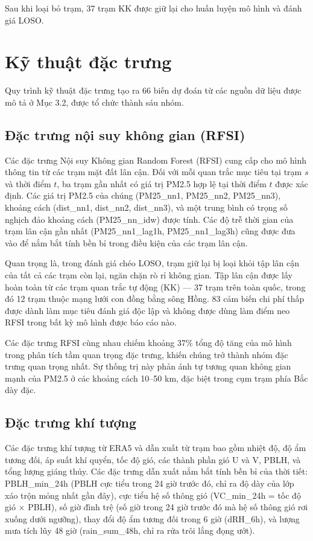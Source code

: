 Sau khi loại bỏ trạm, 37 trạm KK được giữ lại cho huấn luyện mô hình và đánh giá LOSO.


\section{Kỹ thuật đặc trưng}

Quy trình kỹ thuật đặc trưng tạo ra 66 biến dự đoán từ các nguồn dữ liệu được mô tả ở Mục 3.2, được tổ chức thành sáu nhóm.

\subsection{Đặc trưng nội suy không gian (RFSI)}

Các đặc trưng Nội suy Không gian Random Forest (RFSI) cung cấp cho mô hình thông tin từ các trạm mặt đất lân cận. Đối với mỗi quan trắc mục tiêu tại trạm $s$ và thời điểm $t$, ba trạm gần nhất có giá trị PM2.5 hợp lệ tại thời điểm $t$ được xác định. Các giá trị PM2.5 của chúng (PM25\_nn1, PM25\_nn2, PM25\_nn3), khoảng cách (dist\_nn1, dist\_nn2, dist\_nn3), và một trung bình có trọng số nghịch đảo khoảng cách (PM25\_nn\_idw) được tính. Các độ trễ thời gian của trạm lân cận gần nhất (PM25\_nn1\_lag1h, PM25\_nn1\_lag3h) cũng được đưa vào để nắm bắt tính bền bỉ trong điều kiện của các trạm lân cận.

Quan trọng là, trong đánh giá chéo LOSO, trạm giữ lại bị loại khỏi tập lân cận của tất cả các trạm còn lại, ngăn chặn rò rỉ không gian. Tập lân cận được lấy hoàn toàn từ các trạm quan trắc tự động (KK) --- 37 trạm trên toàn quốc, trong đó 12 trạm thuộc mạng lưới con đồng bằng sông Hồng. 83 cảm biến chi phí thấp được dành làm mục tiêu đánh giá độc lập và không được dùng làm điểm neo RFSI trong bất kỳ mô hình được báo cáo nào.

Các đặc trưng RFSI cùng nhau chiếm khoảng 37\% tổng độ tăng của mô hình trong phân tích tầm quan trọng đặc trưng, khiến chúng trở thành nhóm đặc trưng quan trọng nhất. Sự thống trị này phản ánh tự tương quan không gian mạnh của PM2.5 ở các khoảng cách 10--50 km, đặc biệt trong cụm trạm phía Bắc dày đặc.

\subsection{Đặc trưng khí tượng}

Các đặc trưng khí tượng từ ERA5 và dẫn xuất từ trạm bao gồm nhiệt độ, độ ẩm tương đối, áp suất khí quyển, tốc độ gió, các thành phần gió U và V, PBLH, và tổng lượng giáng thủy. Các đặc trưng dẫn xuất nắm bắt tính bền bỉ của thời tiết: PBLH\_min\_24h (PBLH cực tiểu trong 24 giờ trước đó, chỉ ra độ dày của lớp xáo trộn mỏng nhất gần đây), cực tiểu hệ số thông gió (VC\_min\_24h = tốc độ gió $\times$ PBLH), số giờ đình trệ (số giờ trong 24 giờ trước đó mà hệ số thông gió rơi xuống dưới ngưỡng), thay đổi độ ẩm tương đối trong 6 giờ (dRH\_6h), và lượng mưa tích lũy 48 giờ (rain\_sum\_48h, chỉ ra rửa trôi lắng đọng ướt).

